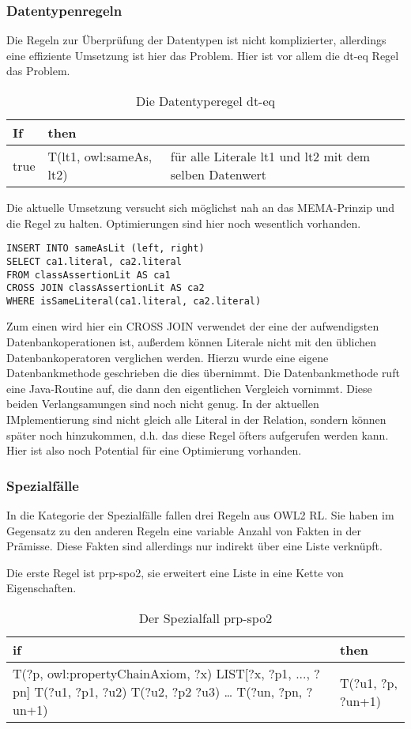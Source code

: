 \subsubsection{Datentypenregeln}
Die Regeln zur Überprüfung der Datentypen ist nicht komplizierter, allerdings eine effiziente Umsetzung ist hier das Problem. Hier ist vor allem die dt-eq Regel das Problem.
\begin{table}
\begin{tabular}{l|l|l}
If & then & \\ \hline
true & T(lt1, owl:sameAs, lt2) & für alle Literale lt1 und lt2 mit dem selben Datenwert
\end{tabular}
\caption{Die Datentyperegel dt-eq}
\label{rule-dt-eq}
\end{table}


Die aktuelle Umsetzung versucht sich möglichst nah an das MEMA-Prinzip und die Regel zu halten. Optimierungen sind hier noch wesentlich vorhanden.

\begin{lstlisting}
INSERT INTO sameAsLit (left, right)
SELECT ca1.literal, ca2.literal
FROM classAssertionLit AS ca1
CROSS JOIN classAssertionLit AS ca2
WHERE isSameLiteral(ca1.literal, ca2.literal)
\end{lstlisting}

Zum einen wird hier ein CROSS JOIN verwendet der eine der aufwendigsten Datenbankoperationen ist, außerdem können Literale nicht mit den üblichen Datenbankoperatoren verglichen werden. Hierzu wurde eine eigene Datenbankmethode geschrieben die dies übernimmt. Die Datenbankmethode ruft eine Java-Routine auf, die dann den eigentlichen Vergleich vornimmt. Diese beiden Verlangsamungen sind noch nicht genug. In der aktuellen IMplementierung sind nicht gleich alle Literal in der Relation, sondern können später noch hinzukommen, d.h. das diese Regel öfters aufgerufen werden kann. Hier ist also noch Potential für eine Optimierung vorhanden.


\subsubsection{Spezialfälle} 
In die Kategorie der Spezialfälle fallen drei Regeln aus OWL2 RL. Sie haben im Gegensatz zu den anderen Regeln eine variable Anzahl von Fakten in der Prämisse. Diese Fakten sind allerdings nur indirekt über eine Liste verknüpft.

Die erste Regel ist prp-spo2, sie erweitert eine Liste in eine Kette von Eigenschaften.
\begin{table}
\begin{tabular}{l|l}
if & then \\ \hline
T(?p, owl:propertyChainAxiom, ?x)
LIST[?x, ?p1, ..., ?pn]
T(?u1, ?p1, ?u2)
T(?u2, ?p2 ?u3)
\ldots
T(?un, ?pn, ?un+1) & T(?u1, ?p, ?un+1)
\end{tabular}
\caption{Der Spezialfall prp-spo2}
\label{rule-prp-spo2}
\end{table}

